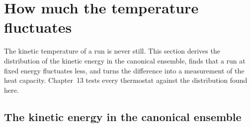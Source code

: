 \section{How much the temperature fluctuates}
\label{sec:sm-kinetic}

The kinetic temperature of a run is never still. This section derives the
distribution of the kinetic energy in the canonical ensemble, finds that
a run at fixed energy fluctuates less, and turns the difference into a
measurement of the heat capacity. Chapter~13 tests every thermostat
against the distribution found here.

\subsection*{The kinetic energy in the canonical ensemble}

